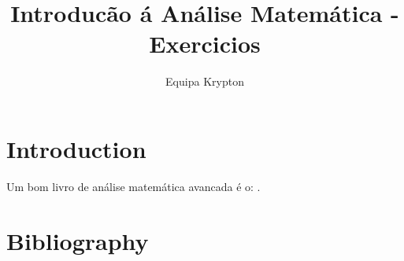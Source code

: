 \documentclass{article}
\title{Introducão á Análise Matemática - Exercicios}
\author{Equipa Krypton}
\begin{document}
\maketitle

\section{Introduction}

Um bom livro de análise matemática avancada é o:  \cite{friedman1970foundations}.


\newpage
\section*{Bibliography}
\printbibliography
\end{document}
